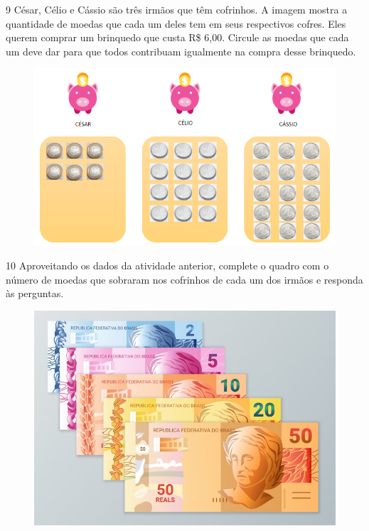 \begin{mdframed}[linewidth=2pt,linecolor=salmao,roundcorner=10pt]

\vspace*{8cm}
\end{mdframed}
\pagebreak

\num{9} César, Célio e Cássio são três irmãos que têm cofrinhos. A
imagem mostra a quantidade de moedas que cada um deles tem em
seus respectivos cofres. Eles querem comprar um brinquedo que custa R\$ 6,00.
Circule as moedas que cada um deve dar para que todos contribuam
igualmente na compra desse brinquedo.

\begin{figure}[htpb!]
\includegraphics[width=\textwidth]{./media/image76.png}
\end{figure}


\num{10} Aproveitando os dados da atividade anterior, complete o quadro com o número de moedas que sobraram nos cofrinhos de cada um dos irmãos e responda às perguntas.

\begin{figure}[htpb!]
\centering
\includegraphics[width=.6\textwidth]{./media/image77.png}
\end{figure}

